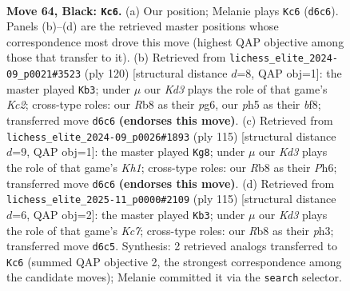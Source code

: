 \documentclass[11pt]{article}
\begin{document}
\clearpage

\begin{figure}[p]\centering
\begin{subfigure}{0.46\textwidth}\centering
\resizebox{\linewidth}{!}{%
\newchessgame
\chessboard[
  setfen={1r6/6Q1/3k4/6PP/4P3/8/2K5/8 b - - 0 64},
  showmover=false,
  pgfstyle=straightmove, color=movearrow, markmove={d6-c6}
]}
\caption{}
\end{subfigure}\hfill
\begin{subfigure}{0.46\textwidth}\centering
\resizebox{\linewidth}{!}{%
\newchessgame
\chessboard[
  setfen={3k1b2/8/6p1/4q2p/8/8/2K5/8 w - - 6 61},
  showmover=false,
  pgfstyle=straightmove, color=movearrow, markmove={c2-b3}
]}
\caption{}
\end{subfigure}
\\[4pt]
\begin{subfigure}{0.46\textwidth}\centering
\resizebox{\linewidth}{!}{%
\newchessgame
\chessboard[
  setfen={7k/4Q3/7p/4K2P/8/1P6/2P5/8 b - - 14 58},
  showmover=false,
  pgfstyle=straightmove, color=movearrow, markmove={h8-g8}
]}
\caption{}
\end{subfigure}\hfill
\begin{subfigure}{0.46\textwidth}\centering
\resizebox{\linewidth}{!}{%
\newchessgame
\chessboard[
  setfen={8/8/3P3p/8/3Q4/7P/2k5/5K2 b - - 0 58},
  showmover=false,
  pgfstyle=straightmove, color=movearrow, markmove={c2-b3}
]}
\caption{}
\end{subfigure}
\caption{\textbf{Move 64, Black: \texttt{Kc6}.} (a) Our position; Melanie plays \texttt{Kc6} (\texttt{d6c6}). Panels (b)--(d) are the retrieved master positions whose correspondence most drove this move (highest QAP objective among those that transfer to it). (b) Retrieved from \texttt{lichess\_elite\_2024-09\_p0021\#3523} (ply 120) [structural distance $d$=8, QAP obj=1]: the master played \texttt{Kb3}; under $\mu$ our \emph{Kd3} plays the role of that game's \emph{Kc2}; cross-type roles: our \emph{R}b8 as their \emph{p}g6, our \emph{p}h5 as their \emph{b}f8; transferred move \texttt{d6c6} \textbf{(endorses this move)}. (c) Retrieved from \texttt{lichess\_elite\_2024-09\_p0026\#1893} (ply 115) [structural distance $d$=9, QAP obj=1]: the master played \texttt{Kg8}; under $\mu$ our \emph{Kd3} plays the role of that game's \emph{Kh1}; cross-type roles: our \emph{R}b8 as their \emph{P}h6; transferred move \texttt{d6c6} \textbf{(endorses this move)}. (d) Retrieved from \texttt{lichess\_elite\_2025-11\_p0000\#2109} (ply 115) [structural distance $d$=6, QAP obj=2]: the master played \texttt{Kb3}; under $\mu$ our \emph{Kd3} plays the role of that game's \emph{Kc7}; cross-type roles: our \emph{R}b8 as their \emph{p}h3; transferred move \texttt{d6c5}. Synthesis: 2 retrieved analogs transferred to \texttt{Kc6} (summed QAP objective 2, the strongest correspondence among the candidate moves); Melanie committed it via the \texttt{search} selector.}
\label{fig:thought-m127}
\end{figure}
\end{document}
